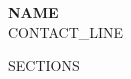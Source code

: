 \documentclass[letterpaper,11pt]{article}
\begin{document}
\begin{center}
\textbf{\Huge \scshape {{NAME}}} \\ \vspace{5pt}
\small {{CONTACT_LINE}}
\end{center}

{{SECTIONS}}
\end{document}

